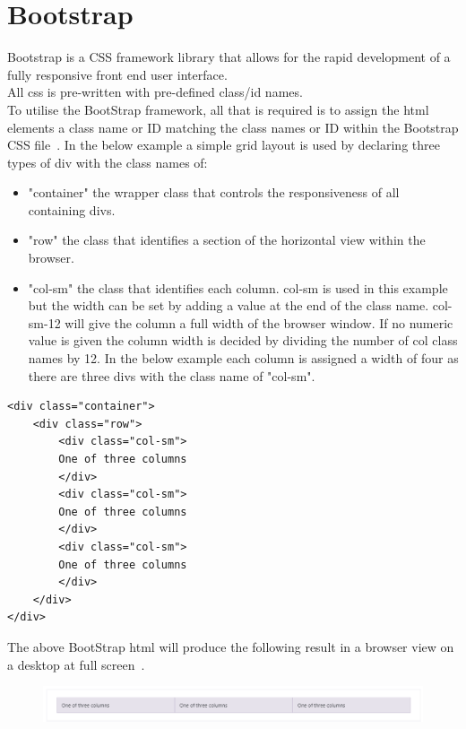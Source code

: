 \section{Bootstrap} 
Bootstrap is a CSS framework library that allows for the rapid development of a fully responsive front end user interface.\\
All css is pre-written with pre-defined class/id names.\\
To utilise the BootStrap framework, all that is required is to assign the html elements a class name or ID matching the class names or ID within the Bootstrap CSS file~\cite{Bootstrap:online}.
In the below example a simple grid layout is used by declaring three types of div with the class names of:
\begin{itemize}
	\item "container" the wrapper class that controls the responsiveness of all containing divs.
	\item "row" the class that identifies a section of the horizontal view within the browser.
	\item "col-sm" the class that identifies each column. col-sm is used in this example but the width can be set by adding a value at the end of the class name. col-sm-12 will give the column a full width of the browser window. If no numeric value is given the column width is decided by dividing the number of col class names by 12. In the below example each column is assigned a width of four as there are three divs with the class name of "col-sm".
\end{itemize} 

\begin{verbatim}
<div class="container">
	<div class="row">
		<div class="col-sm">
		One of three columns
		</div>
		<div class="col-sm">
		One of three columns
		</div>
		<div class="col-sm">
		One of three columns
		</div>
	</div>
</div>
\end{verbatim}

The above BootStrap html will produce the following result in a browser view on a desktop at full screen~\cite{BootstrapGridExample:online}.
\begin{figure}[H]
	\centering
	\includegraphics[width=0.7\linewidth]{img/BootstrapFullScreen}
	\caption{}
	\label{fig:bootstrapfullscreen}
\end{figure}


